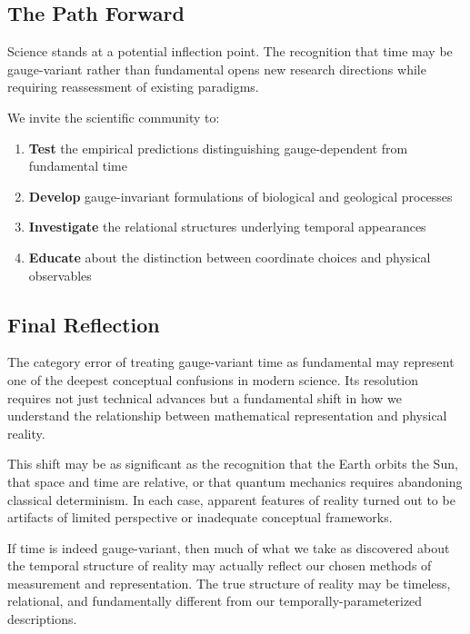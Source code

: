 \documentclass[11pt]{article}
\theoremstyle{definition}
\theoremstyle{plain}
\theoremstyle{remark}
\begin{document}
\subsection{The Path Forward}

Science stands at a potential inflection point. The recognition that time may be gauge-variant rather than fundamental opens new research directions while requiring reassessment of existing paradigms.

\begin{keypoint}
We invite the scientific community to:
\begin{enumerate}
\item \textbf{Test} the empirical predictions distinguishing gauge-dependent from fundamental time
\item \textbf{Develop} gauge-invariant formulations of biological and geological processes  
\item \textbf{Investigate} the relational structures underlying temporal appearances
\item \textbf{Educate} about the distinction between coordinate choices and physical observables
\end{enumerate}
\end{keypoint}

\subsection{Final Reflection}

The category error of treating gauge-variant time as fundamental may represent one of the deepest conceptual confusions in modern science. Its resolution requires not just technical advances but a fundamental shift in how we understand the relationship between mathematical representation and physical reality.

This shift may be as significant as the recognition that the Earth orbits the Sun, that space and time are relative, or that quantum mechanics requires abandoning classical determinism. In each case, apparent features of reality turned out to be artifacts of limited perspective or inadequate conceptual frameworks.

If time is indeed gauge-variant, then much of what we take as discovered about the temporal structure of reality may actually reflect our chosen methods of measurement and representation. The true structure of reality may be timeless, relational, and fundamentally different from our temporally-parameterized descriptions.
\end{document}
